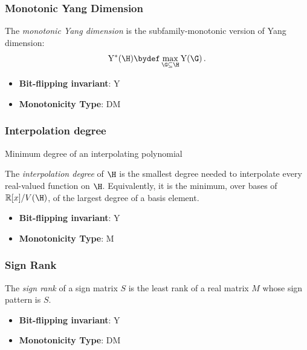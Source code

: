 \subsubsection{Monotonic Yang Dimension}
      \begin{definition}\label{def:monotonic_yang_dimension}
      The \emph{monotonic Yang dimension} is the subfamily-monotonic version of Yang dimension:
      \[
      \mathrm{Y}^*(\H)\bydef \max_{\G\subseteq\H}\mathrm{Y}(\G)\,.
      \]
      \end{definition}
      \begin{itemize}
      \item {\bf Bit-flipping invariant}: Y
      \item {\bf Monotonicity Type}: DM
      \end{itemize}
\subsubsection{Interpolation degree}
      Minimum degree of an interpolating polynomial
      \begin{definition}\label{def:interpolation_degree}
      The \emph{interpolation degree} of $\H$ is the smallest degree needed to interpolate every real-valued function on $\H$.  Equivalently, it is the minimum, over bases of $\mathbb{R}[x]/V(\H)$, of the largest degree of a basis element.
      \end{definition}
      \begin{itemize}
      \item {\bf Bit-flipping invariant}: Y
      \item {\bf Monotonicity Type}: M
      \end{itemize}
\subsubsection{Sign Rank}
      
      \begin{definition}\label{def:sign_rank}
      The \emph{sign rank} of a sign matrix $S$ is the least rank of a real matrix $M$ whose sign pattern is $S$.
      \end{definition}
      \begin{itemize}
      \item {\bf Bit-flipping invariant}: Y
      \item {\bf Monotonicity Type}: DM
      \end{itemize}
